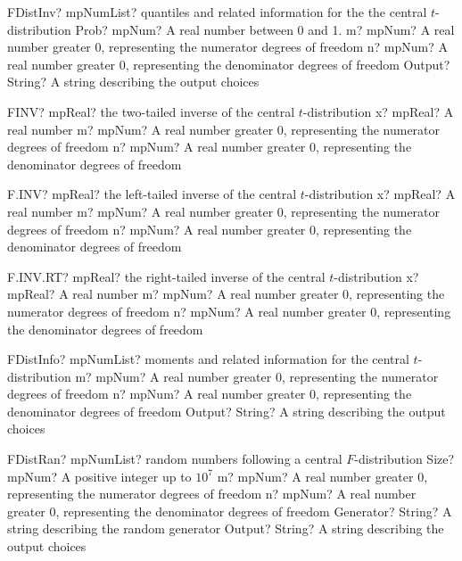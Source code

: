 \documentclass[12pt,a4paper,openany]{book}
\begin{document}
\begin{mpFunctionsExtract}
\mpFunctionThreeNotImplemented
{FDistInv? mpNumList? quantiles and related information for the the central $t$-distribution}
{Prob? mpNum? A real number between 0 and 1.}
{m? mpNum? A real number greater 0, representing the numerator  degrees of freedom}
{n? mpNum? A real number greater 0, representing the denominator degrees of freedom}
{Output? String? A string describing the output choices}
\end{mpFunctionsExtract}

\begin{mpFunctionsExtract}
\mpWorksheetFunctionThreeNotImplemented
{FINV? mpReal? the two-tailed inverse of the central $t$-distribution}
{x? mpReal? A real number}
{m? mpNum? A real number greater 0, representing the numerator  degrees of freedom}
{n? mpNum? A real number greater 0, representing the denominator degrees of freedom}
\end{mpFunctionsExtract}

\begin{mpFunctionsExtract}
\mpWorksheetFunctionThreeNotImplemented
{F.INV? mpReal? the left-tailed inverse of the central $t$-distribution}
{x? mpReal? A real number}
{m? mpNum? A real number greater 0, representing the numerator  degrees of freedom}
{n? mpNum? A real number greater 0, representing the denominator degrees of freedom}
\end{mpFunctionsExtract}

\begin{mpFunctionsExtract}
\mpWorksheetFunctionThreeNotImplemented
{F.INV.RT? mpReal? the right-tailed inverse of the central $t$-distribution}
{x? mpReal? A real number}
{m? mpNum? A real number greater 0, representing the numerator  degrees of freedom}
{n? mpNum? A real number greater 0, representing the denominator degrees of freedom}
\end{mpFunctionsExtract}

\begin{mpFunctionsExtract}
\mpFunctionThreeNotImplemented
{FDistInfo? mpNumList? moments and related information for the central $t$-distribution}
{m? mpNum? A real number greater 0, representing the numerator  degrees of freedom}
{n? mpNum? A real number greater 0, representing the denominator degrees of freedom}
{Output? String? A string describing the output choices}
\end{mpFunctionsExtract}

\begin{mpFunctionsExtract}
\mpFunctionFiveNotImplemented
{FDistRan? mpNumList? random numbers following a central $F$-distribution}
{Size? mpNum? A positive integer up to $10^7$}
{m? mpNum? A real number greater 0, representing the numerator  degrees of freedom}
{n? mpNum? A real number greater 0, representing the denominator degrees of freedom}
{Generator? String? A string describing the random generator}
{Output? String? A string describing the output choices}
\end{mpFunctionsExtract}
\end{document}
